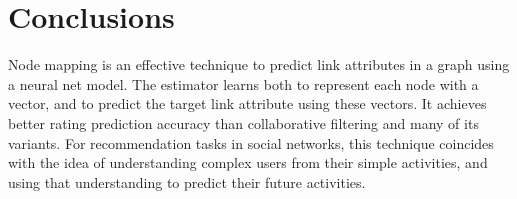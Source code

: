 \documentclass{article}
\begin{document}
\section{Conclusions}
Node mapping is an effective technique to predict link attributes in a graph 
using a neural net model.
The estimator learns both to represent each node with a vector, and to predict 
the target link attribute using these vectors.
It achieves better rating prediction accuracy than collaborative filtering and 
many of its variants.
For recommendation tasks in social networks, this technique coincides with the 
idea of understanding complex users from their simple activities, and using 
that understanding to predict their future activities.



\end{document}
